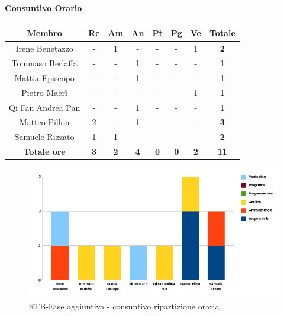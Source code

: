 \paragraph{Consuntivo Orario}
\begin{center}
	\renewcommand{\arraystretch}{1.8}
	\begin{tabular}{ |c|c|c|c|c|c|c|c| }
	\hline
	\textbf{Membro} & \textbf{Re} & \textbf{Am} &  \textbf{An} &  \textbf{Pt} &  \textbf{Pg} &  \textbf{Ve} &  \textbf{Totale}\\
    \hline
    Irene Benetazzo   & - & 1 & - & - & - & 1 & \textbf{2} \\
    \hline
    Tommaso Berlaffa  & - & - & 1 & - & - & - & \textbf{1} \\
    \hline
    Mattia Episcopo   & - & - & 1 & - & - & - & \textbf{1} \\
    \hline
    Pietro Macrì      & - & - & - & - & - & 1 & \textbf{1} \\
    \hline
    Qi Fan Andrea Pan & - & - & 1 & - & - & - & \textbf{1} \\
    \hline
    Matteo Pillon     & 2 & - & 1 & - & - & - & \textbf{3} \\
    \hline
    Samuele Rizzato   & 1 & 1 & - & - & - & - & \textbf{2} \\
    \hline
    \textbf{Totale ore} & \textbf{3} & \textbf{2} &  \textbf{4} &  \textbf{0} &  \textbf{0} &  \textbf{2} &  \textbf{11}\\
    \hline
	\end{tabular}
\end{center}

\begin{figure}[H]
    \centering\includegraphics[width=\textwidth, height=\textheight,keepaspectratio]{images/consuntivo/RTB-fase-aggiuntiva-ore.png}
    \caption{RTB-Fase aggiuntiva - consuntivo ripartizione oraria}
\end{figure}

